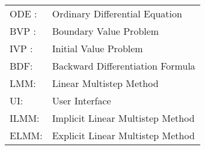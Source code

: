 \begin{tabular}{ll}
    ODE : & Ordinary Differential Equation \\
    BVP : & Boundary Value Problem \\
    IVP : & Initial Value Problem \\
    BDF: &Backward Differentiation Formula \\
    LMM: &Linear Multistep Method \\
    UI: &User Interface \\
    ILMM:& Implicit Linear Multistep Method \\
    ELMM: & Explicit Linear Multistep Method
\end{tabular}